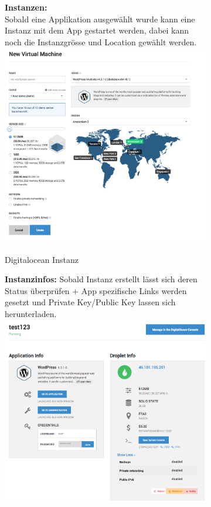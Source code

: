 \begin{figure}[!htbp]
   \begin{subfigure}[b]{.49\textwidth}
\textbf{Instanzen:}\\
Sobald eine Applikation ausgewählt wurde kann eine Instanz mit dem App gestartet 
werden, dabei kann noch die Instanzgrösse und Location gewählt werden.
\includegraphics[width=\textwidth]{./03_Analyse/03_Bitnami/images/digitalocean_size}
\caption{Digitalocean Instanz}
\end{subfigure}
  \hfill
 \begin{subfigure}[b]{.49\textwidth}
  \textbf{Instanzinfos:}
  Sobald Instanz erstellt lässt sich deren Status überprüfen + App spezifische 
Links werden gesetzt und Private Key/Public Key lassen sich herunterladen.\\
\includegraphics[width=\textwidth]{./03_Analyse/03_Bitnami/images/digitalocean_instanceinfo}

\end{subfigure}
\end{figure}
